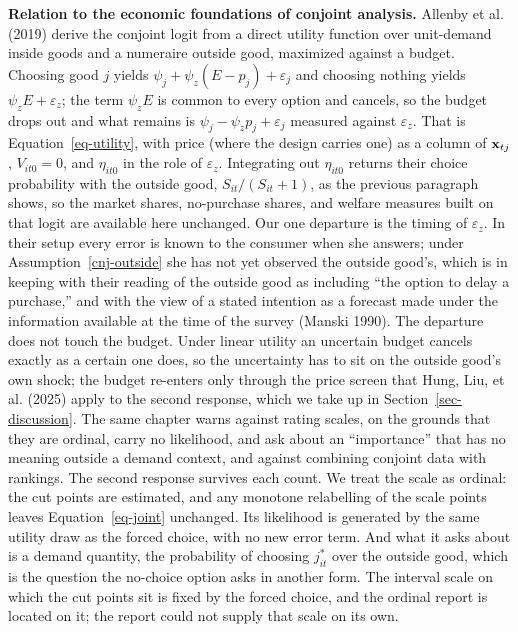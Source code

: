 \documentclass[
  letterpaper,
  DIV=11,
  numbers=noendperiod]{scrartcl}
\theoremstyle{plain}
\theoremstyle{plain}
\theoremstyle{plain}
\theoremstyle{remark}
\begin{document}
\textbf{Relation to the economic foundations of conjoint analysis.}
Allenby et al. (2019) derive the conjoint logit from a direct utility
function over unit-demand inside goods and a numeraire outside good,
maximized against a budget. Choosing good \(j\) yields
\(\psi_j + \psi_z \left( E - p_j \right) + \varepsilon_j\) and choosing
nothing yields \(\psi_z E + \varepsilon_z\); the term \(\psi_z E\) is
common to every option and cancels, so the budget drops out and what
remains is \(\psi_j - \psi_z p_j + \varepsilon_j\) measured against
\(\varepsilon_z\). That is Equation~\ref{eq-utility}, with price (where
the design carries one) as a column of \(\mathbf{x}_{tj}\), \(V_{it0} = 0\), and
\(\eta_{it0}\) in the role of \(\varepsilon_z\). Integrating out
\(\eta_{it0}\) returns their choice probability with the outside good,
\(S_{it} \big/ \left( S_{it} + 1 \right)\), as the previous paragraph
shows, so the market shares, no-purchase shares, and welfare measures
built on that logit are available here unchanged. Our one departure is
the timing of \(\varepsilon_z\). In their setup every error is known to
the consumer when she answers; under Assumption~\ref{cnj-outside} she
has not yet observed the outside good's, which is in keeping with their
reading of the outside good as including ``the option to delay a
purchase,'' and with the view of a stated intention as a forecast made
under the information available at the time of the survey (Manski 1990).
The departure does not touch the budget. Under linear utility an
uncertain budget cancels exactly as a certain one does, so the
uncertainty has to sit on the outside good's own shock; the budget
re-enters only through the price screen that Hung, Liu, et al. (2025)
apply to the second response, which we take up in
Section~\ref{sec-discussion}. The same chapter warns against rating
scales, on the grounds that they are ordinal, carry no likelihood, and
ask about an ``importance'' that has no meaning outside a demand
context, and against combining conjoint data with rankings. The second
response survives each count. We treat the scale as ordinal: the cut
points are estimated, and any monotone relabelling of the scale points
leaves Equation~\ref{eq-joint} unchanged. Its likelihood is generated by
the same utility draw as the forced choice, with no new error term. And
what it asks about is a demand quantity, the probability of choosing
\(j^*_{it}\) over the outside good, which is the question the no-choice
option asks in another form. The interval scale on which the cut points
sit is fixed by the forced choice, and the ordinal report is located on
it; the report could not supply that scale on its own.
\end{document}
